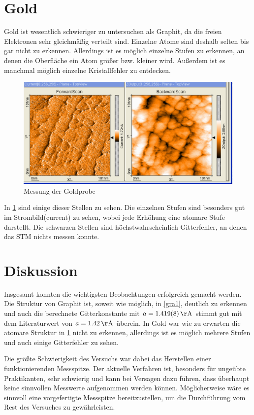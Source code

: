 \documentclass[
	a4paper,
	12pt,
	pagesize,
	ngerman
]{scrartcl}
\begin{document}
\section{Gold}
Gold ist wesentlich schwieriger zu untersuchen als Graphit, da die freien Elektronen sehr gleichmäßig verteilt sind. Einzelne Atome sind deshalb selten bis gar nicht zu erkennen. Allerdings ist es möglich einzelne Stufen zu erkennen, an denen die Oberfläche ein Atom größer bzw. kleiner wird. Außerdem ist es manchmal möglich einzelne Kristallfehler zu entdecken. 

\begin{figure}[h!]
	\centering
	\includegraphics[scale=0.6]{Stufe.png}
	\caption{Messung der Goldprobe}
	\label{gold}
\end{figure}


In \cref{gold} sind einige dieser Stellen zu sehen. Die einzelnen Stufen sind besonders gut im  Strombild(current) zu sehen, wobei jede Erhöhung eine atomare Stufe darstellt. Die schwarzen Stellen sind höchstwahrscheinlich Gitterfehler, an denen das STM nichts messen konnte.

\section{Diskussion}
Insgesamt konnten die wichtigsten Beobachtungen erfolgreich gemacht werden. Die Struktur von Graphit ist, soweit wie möglich, in \cref{gra1}, deutlich zu erkennen und auch die berechnete Gitterkonstante mit $a = \SI{1,419 \pm 0,008} {\AA}$ stimmt gut mit dem Literaturwert von $a = \SI{1,42} {\AA}$ überein. In Gold war wie zu erwarten die atomare Struktur in \cref{gold} nicht zu erkennen, allerdings ist es möglich mehrere Stufen und auch einige Gitterfehler zu sehen. 

Die größte Schwierigkeit des Versuchs war dabei das Herstellen einer funktionierenden Messspitze. Der aktuelle Verfahren ist, besonders für ungeübte Praktikanten, sehr schwierig und kann bei Versagen dazu führen, dass überhaupt keine sinnvollen Messwerte aufgenommen werden können. Möglicherweise wäre es sinnvoll eine vorgefertigte Messspitze bereitzustellen, um die Durchführung vom Rest des Versuches zu gewährleisten.
 
\end{document}
